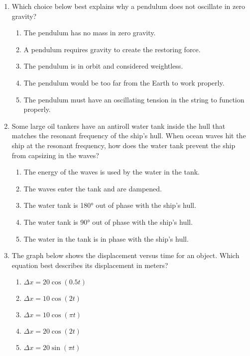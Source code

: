 \documentclass{../../../oss-classkick}
\begin{document}
\begin{multicols}{2}
\begin{enumerate}[leftmargin=18pt]
  \item Which choice below best explains why a pendulum does not oscillate
    in zero gravity?
    \begin{enumerate}[nosep,leftmargin=18pt,label=(\Alph*)]
    \item The pendulum has no mass in zero gravity.
    \item A pendulum requires gravity to create the restoring force.
    \item The pendulum is in orbit and considered weightless.
    \item The pendulum would be too far from the Earth to work properly.
    \item The pendulum must have an oscillating tension in the string to
      function properly.
    \end{enumerate}
    \columnbreak
    
  \item Some large oil tankers have an antiroll water tank inside the hull that
    matches the resonant frequency of the ship’s hull. When ocean waves hit the
    ship at the resonant frequency, how does the water tank prevent the ship
    from capsizing in the waves?
    \begin{enumerate}[nosep,leftmargin=18pt,label=(\Alph*)]
    \item The energy of the waves is used by the water in the tank.
    \item The waves enter the tank and are dampened.
    \item The water tank is \ang{180} out of phase with the ship's hull.
    \item The water tank is \ang{90} out of phase with the ship's hull.
    \item The water in the tank is in phase with the ship's hull.
    \end{enumerate}
    \vspace{.7in}
    
  \item The graph below shows the displacement versus time for an object. Which
    equation best describes its displacement in meters?
    \begin{enumerate}[nosep,leftmargin=18pt,label=(\Alph*)]
    \item $\Delta x=20\cos(0.5t)$
    \item $\Delta x=10\cos(2t)$
    \item $\Delta x=10\cos(\pi t)$
    \item $\Delta x=20\cos(2t)$
    \item $\Delta x=20\sin(\pi t)$
    \end{enumerate}
    \vspace{.7in}
    

\end{enumerate}
\end{multicols}
\end{document}
